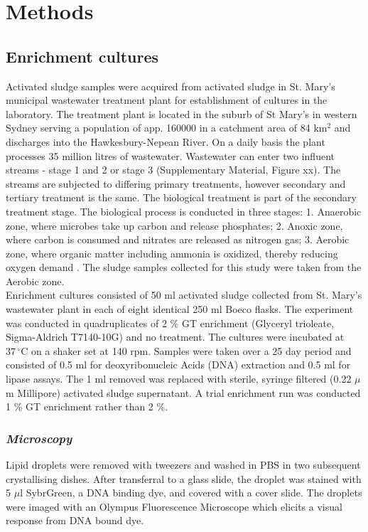\documentclass[twoside]{article}
\begin{document}
\section{Methods}
\thispagestyle{plain}
\subsection{Enrichment cultures}

Activated sludge samples were acquired from activated sludge in St. Mary’s municipal wastewater treat­ment plant for establishment of cultures in the laboratory. The treatment plant is located in the suburb of St Mary's in western Sydney serving a population of app. 160000 in a catchment area of 84 km$^{2}$ and discharges into the Hawkesbury-Nepean River. On a daily basis the plant processes 35 million litres of wastewater. Wastewater can enter two influent streams - stage 1 and 2 or stage 3 (Supplementary Material, Figure xx). The streams are subjected to differing primary treatments, however secondary and tertiary treatment is the same. The biological treatment is part of the secondary treatment stage. The biological process is conducted in three stages: 1. Anaerobic zone, where microbes take up carbon and release phosphates; 2. Anoxic zone, where carbon is consumed and nitrates are released as nitrogen gas; 3. Aerobic zone, where organic matter including ammonia is oxidized, thereby reducing oxygen demand \cite{stmarys}. The sludge samples collected for this study were taken from the Aerobic zone.\\


Enrichment cultures consisted of 50 ml activated sludge collected from St. Mary's wastewater plant in each of eight identical 250 ml Boeco flasks. The experiment was conducted in quadruplicates of 2 \% GT enrichment (Glyceryl trioleate, Sigma-Aldrich T7140-10G) and no treatment. The cultures were incubated at $37\,^{\circ}\mathrm{C}$ on a shaker set at 140 rpm. Samples were taken over a 25 day period and consisted of 0.5 ml for deoxyri­bonucleic Acids (DNA) extraction and 0.5 ml for lipase assays. The 1 ml removed was replaced with sterile, syringe filtered (0.22 $\mu$m Millipore) activated sludge supernatant. 
A trial enrichment run was conducted 1 \% GT enrichment rather than 2 \%.

\subsubsection{\emph{Microscopy}}
Lipid droplets were removed with tweezers and washed in PBS in two subsequent crystallising dishes. After transferral to a glass slide, the droplet was stained with 5 $\mu$l SybrGreen, a DNA binding dye, and covered with a cover slide. The droplets were imaged with an Olympus Fluorescence Microscope which elicits a visual response from DNA bound dye.
\end{document}

